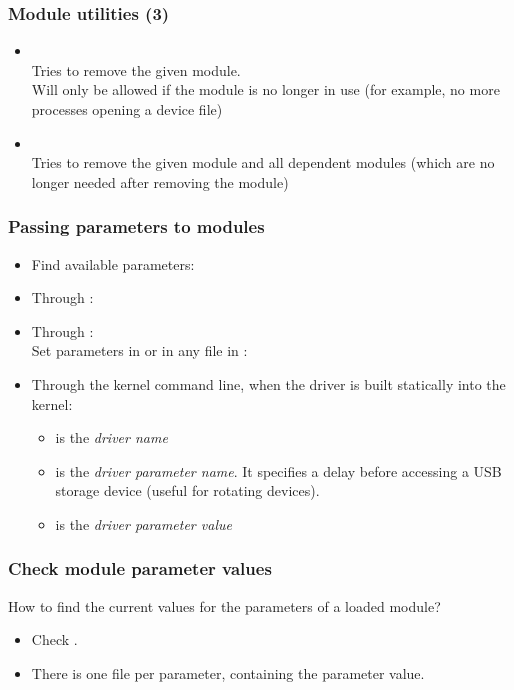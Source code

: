 \begin{frame}
  \frametitle{Module utilities (3)}
  \begin{itemize}
  \item {}\\
    Tries to remove the given module.\\
    Will only be allowed if the module is no longer in use (for
    example, no more processes opening a device file)
  \item {}\\
    Tries to remove the given module and all dependent modules (which
    are no longer needed after removing the module)
  \end{itemize}
\end{frame}

\begin{frame}
  \frametitle{Passing parameters to modules}
  \begin{itemize}
  \item Find available parameters:\\
  \item Through :\\
  \item Through :\\
    Set parameters in  or in any file in :\\
  \item Through the kernel command line, when the driver is built statically into the kernel:\\
    \begin{itemize}
    \item {} is the {\em driver name}
    \item {} is the {\em driver parameter name}. It
      specifies a delay before accessing a USB storage device (useful for
      rotating devices).
    \item {} is the {\em driver parameter value}
    \end{itemize}
  \end{itemize}
\end{frame}

\begin{frame}
  \frametitle{Check module parameter values}
  How to find the current values for the parameters of a loaded module?
  \begin{itemize}
  \item Check .
  \item There is one file per parameter, containing the parameter value.
  \end{itemize}
\end{frame}

